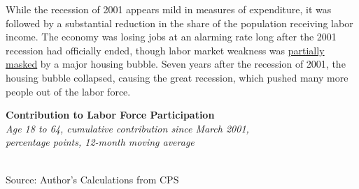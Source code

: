 \documentclass{report}
\makeatletter
\newcommand{\tbllink}[1]{\href{https://raw.githubusercontent.com/bdecon/US-chartbook/master/chartbook/data/#1}{\faTable}}
\newcommand*\short[1]{\expandafter\@gobbletwo\number\numexpr#1\relax}
\newcommand{\absnode}[3]{\node[below right, align=left] at (axis cs: #1,#2) {#3};}
\newcommand{\dateaxisticks}{
		date coordinates in=x, axis line style={draw=none},
		xmax={2023-10-01},
		max space between ticks=40,	    
		xtick={{1990-01-01}, {1992-01-01}, {1994-01-01}, 
			{1996-01-01}, {1998-01-01}, {2000-01-01}, 
			{2002-01-01}, {2004-01-01}, {2006-01-01},
			{2008-01-01}, {2010-01-01}, {2012-01-01}, {2014-01-01},
		    {2016-01-01}, {2018-01-01}, {2020-01-01}, {2022-01-01}, 
		    {2024-01-01}, {2026-01-01}},
		minor xtick={{1989-01-01}, {1991-01-01}, {1993-01-01},
			{1995-01-01}, {1997-01-01}, {1999-01-01}, 
			{2001-01-01}, {2003-01-01}, {2005-01-01}, {2007-01-01},
		    {2009-01-01}, {2011-01-01}, {2013-01-01}, {2015-01-01},
		    {2017-01-01}, {2019-01-01}, {2021-01-01}, {2023-01-01}, 
		    {2025-01-01}, {2027-01-01}},
		enlarge y limits={0.06}, enlarge x limits={0.01},
		}
\newcommand{\bbar}[2]{extra #1 ticks = {{#2}}, extra #1 tick labels = ,
		extra #1 tick style = {grid=major, grid style={thick, black!25}},}
\newcommand{\stdline}[4]{\addplot[very thick, no markers, color=#1] 
		table [x=#2, y=#3, col sep=comma] {#4};	}
\newcommand{\thickline}[4]{\addplot[ultra thick, no markers, color=#1] 
		table [x=#2, y=#3, col sep=comma] {#4};	}
\newcommand{\rebars}{
		\fill[color=black!10] (axis cs:{2007-12-01},\pgfkeysvalueof{/pgfplots/ymin}) rectangle 
			(axis cs:{2009-07-01}, \pgfkeysvalueof{/pgfplots/ymax});
		\fill[color=black!10] (axis cs:{2001-03-01},\pgfkeysvalueof{/pgfplots/ymin}) rectangle 
			(axis cs:{2001-11-01}, \pgfkeysvalueof{/pgfplots/ymax});
		\fill[color=black!10] (axis cs:{2020-02-01},\pgfkeysvalueof{/pgfplots/ymin}) rectangle 
			(axis cs:{2020-05-01}, \pgfkeysvalueof{/pgfplots/ymax});}
\makeatother
\begin{document}
{\begin{minipage}{0.76\textwidth}
\small While the recession of 2001 appears mild in measures of expenditure, it was followed by a substantial reduction in the share of the population receiving labor income. The economy was losing jobs at an alarming rate long after the 2001 recession had officially ended, though labor market weakness was \href{https://www.aeaweb.org/articles?id=10.1257/jep.30.2.179}{partially masked} by a major housing bubble. Seven years after the recession of 2001, the housing bubble collapsed, causing the great recession, which pushed many more people out of the labor force.
\end{minipage}

\begin{minipage}{0.28\textwidth}
\small  
\end{minipage} \hspace{5mm}
\begin{minipage}{0.48\textwidth}
\normalsize \textbf{Contribution to Labor Force Participation}\\
\footnotesize{\textit{Age 18 to 64, cumulative contribution since March 2001,}}\\
\footnotesize{\textit{percentage points, 12-month moving average}}\\
\hspace*{-3mm} \\
\footnotesize{Source: Author's Calculations from CPS} \hfill \tbllink{nilf.csv}


\end{minipage}}
\end{document}
